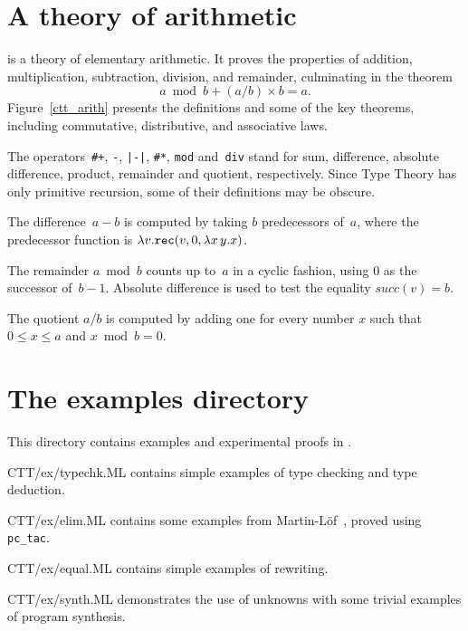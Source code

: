 \section{A theory of arithmetic}
 is a theory of elementary arithmetic.  It proves the
properties of addition, multiplication, subtraction, division, and
remainder, culminating in the theorem
\[ a \bmod b + (a/b)\times b = a. \]
Figure~\ref{ctt_arith} presents the definitions and some of the key
theorems, including commutative, distributive, and associative laws.

The operators~\verb'#+', \verb'-', \verb'|-|', \verb'#*', \verb'mod'
and~\verb'div' stand for sum, difference, absolute difference, product,
remainder and quotient, respectively.  Since Type Theory has only primitive
recursion, some of their definitions may be obscure.  

The difference~$a-b$ is computed by taking $b$ predecessors of~$a$, where
the predecessor function is $\lambda v. {\tt rec}(v, 0, \lambda x\,y.x)$.

The remainder $a\bmod b$ counts up to~$a$ in a cyclic fashion, using 0
as the successor of~$b-1$.  Absolute difference is used to test the
equality $succ(v)=b$.

The quotient $a/b$ is computed by adding one for every number $x$
such that $0\leq x \leq a$ and $x\bmod b = 0$.



\section{The examples directory}
This directory contains examples and experimental proofs in {\CTT}.
\begin{ttdescription}
\item[CTT/ex/typechk.ML]
contains simple examples of type checking and type deduction.

\item[CTT/ex/elim.ML]
contains some examples from Martin-L\"of~\cite{martinlof84}, proved using 
{\tt pc_tac}.

\item[CTT/ex/equal.ML]
contains simple examples of rewriting.

\item[CTT/ex/synth.ML]
demonstrates the use of unknowns with some trivial examples of program
synthesis. 
\end{ttdescription}


